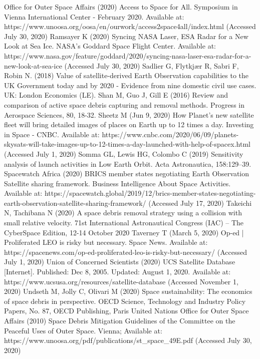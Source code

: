 \documentclass[12pt,a4paper,notitlepage,twoside,openright]{report}
\begin{document}
\begin{thebibliography}{100}
 Office for Outer Space Affairs (2020) Access to Space for All. Symposium in Vienna International Center - February 2020. Available at: https://www.unoosa.org/oosa/en/ourwork/access2space4all/index.html (Accessed July 30, 2020)
 Ramsayer K (2020) Syncing NASA Laser, ESA Radar for a New Look at Sea Ice. NASA's Goddard Space Flight Center. Available at: https://www.nasa.gov/feature/goddard/2020/syncing-nasa-laser-esa-radar-for-a-new-look-at-sea-ice (Accessed July 30, 2020)
 Sadlier G, Flytkjær R, Sabri F, Robin N. (2018) Value of satellite-derived Earth Observation capabilities to the UK Government today and by 2020 - Evidence from nine domestic civil use cases. UK: London Economics (LE).
 Shan M, Guo J, Gill E (2016) Review and comparison of active space debris capturing and removal methods. Progress in Aerospace Sciences, 80, 18-32.
 Sheetz M (Jun 9, 2020) How Planet’s new satellite fleet will bring detailed images of places on Earth up to 12 times a day. Investing in Space - CNBC. Available at: https://www.cnbc.com/2020/06/09/planets-skysats-will-take-images-up-to-12-times-a-day-launched-with-help-of-spacex.html (Accessed July 1, 2020)
 Somma GL, Lewis HG, Colombo C (2019) Sensitivity analysis of launch activities in Low Earth Orbit. Acta Astronautica, 158:129–39.
 Spacewatch Africa (2020) BRICS member states negotiating Earth Observation Satellite sharing framework. Business Intelligence About Space Activities. Available at: https://spacewatch.global/2019/12/brics-member-states-negotiating-earth-observation-satellite-sharing-framework/ (Accessed July 17, 2020)
 Takeichi N, Tachibana N (2020) A space debris removal strategy using a collision with small relative velocity. 71st International Astronautical Congress (IAC) – The CyberSpace Edition, 12-14 October 2020
 Taverney T (March 5, 2020) Op-ed | Proliferated LEO is risky but necessary. Space News. Available at: https://spacenews.com/op-ed-proliferated-leo-is-risky-but-necessary/ (Accessed July 1, 2020)
 Union of Concerned Scientists (2020) UCS Satellite Database [Internet]. Published: Dec 8, 2005. Updated: August 1, 2020. Available at: https://www.ucsusa.org/resources/satellite-database (Accessed November 1, 2020)
 Undseth M, Jolly C, Olivari M (2020) Space sustainability: The economics of space debris in perspective. OECD Science, Technology and Industry Policy Papers, No. 87, OECD Publishing, Paris
 United Nations Office for Outer Space Affairs (2010) Space Debris Mitigation Guidelines of the Committee on the Peaceful Uses of Outer Space. Vienna; Available at: https://www.unoosa.org/pdf/publications/st_space_49E.pdf (Accessed July 30, 2020)

\end{thebibliography}
\end{document}
